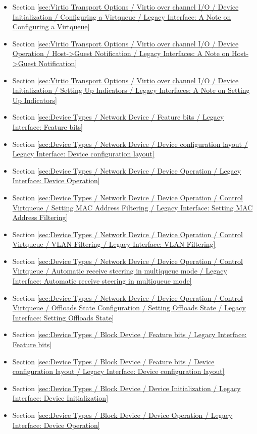 \begin{itemize}
\item Section \ref{sec:Virtio Transport Options / Virtio over channel I/O / Device Initialization / Configuring a Virtqueue / Legacy Interface: A Note on Configuring a Virtqueue}
\item Section \ref{sec:Virtio Transport Options / Virtio over channel I/O / Device Operation / Host->Guest Notification / Legacy Interfaces: A Note on Host->Guest Notification}
\item Section \ref{sec:Virtio Transport Options / Virtio over channel I/O / Device Initialization / Setting Up Indicators / Legacy Interfaces: A Note on Setting Up Indicators}
\item Section \ref{sec:Device Types / Network Device / Feature bits / Legacy Interface: Feature bits}
\item Section \ref{sec:Device Types / Network Device / Device configuration layout / Legacy Interface: Device configuration layout}
\item Section \ref{sec:Device Types / Network Device / Device Operation / Legacy Interface: Device Operation}
\item Section \ref{sec:Device Types / Network Device / Device Operation / Control Virtqueue / Setting MAC Address Filtering / Legacy Interface: Setting MAC Address Filtering}
\item Section \ref{sec:Device Types / Network Device / Device Operation / Control Virtqueue / VLAN Filtering / Legacy Interface: VLAN Filtering}
\item Section \ref{sec:Device Types / Network Device / Device Operation / Control Virtqueue / Automatic receive steering in multiqueue mode / Legacy Interface: Automatic receive steering in multiqueue mode}
\item Section \ref{sec:Device Types / Network Device / Device Operation / Control Virtqueue / Offloads State Configuration / Setting Offloads State / Legacy Interface: Setting Offloads State}
\item Section \ref{sec:Device Types / Block Device / Feature bits / Legacy Interface: Feature bits}
\item Section \ref{sec:Device Types / Block Device / Feature bits / Device configuration layout / Legacy Interface: Device configuration layout}
\item Section \ref{sec:Device Types / Block Device / Device Initialization / Legacy Interface: Device Initialization}
\item Section \ref{sec:Device Types / Block Device / Device Operation / Legacy Interface: Device Operation}

\end{itemize}
